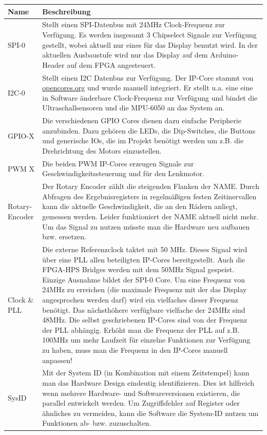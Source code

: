 \begin{longtable}[ht]{|p{} | p{} |}
	\hline
	\textbf{Name} & \textbf{Beschreibung}\\
	\hline
	SPI-0 & Stellt einen SPI-Datenbus mit 24MHz Clock-Frequenz zur Verfügung. Es werden insgesamt 3 Chipselect Signale zur Verfügung gestellt, wobei aktuell nur eines für das Display benutzt wird. In der aktuellen Ausbaustufe wird nur das Display auf dem Arduino-Header auf dem FPGA angesteuert.\\ \hline
	I2C-0 & Stellt einen I2C Datenbus zur Verfügung. Der \ac{IP}-Core stammt von \href{opencores.org}{opencores.org} und wurde manuell integriert. Er stellt u.a. eine eine in Software änderbare Clock-Frequenz zur Verfügung und bindet die Ultraschallsensoren und die MPU-6050 an das System an.\\ \hline
	GPIO-X & Die verschiedenen GPIO Cores dienen dazu einfache Peripherie anzubinden. Dazu gehören die LEDs, die Dip-Switches, die Buttons und generische IOs, die im Projekt benötigt werden um z.B. die Drehrichtung des Motors einzustellen. \\ \hline
	PWM X & Die beiden PWM \ac{IP}-Cores erzeugen Signale zur Geschwindigkeitssteuerung und für den Lenkmotor. \\ \hline
	Rotary-Encoder & Der Rotary Encoder zählt die steigenden Flanken der NAME. Durch Abfragen des Ergebnisregisters in regelmäßigen festen Zeitinervallen kann die aktuelle Geschwindigkeit, die an den Rädern anliegt, gemessen werden. Leider funktioniert der NAME aktuell nicht mehr. Um das Signal zu nutzen müsste man die Hardware neu aufbauen bzw. ersetzen.\\ \hline
	Clock \& \ac{PLL} & Die externe Referenzclock taktet mit 50 MHz. Dieses Signal wird über eine \ac{PLL} allen beteiligten IP-Cores bereitgestellt. Auch die \ac{FPGA}-\ac{HPS} Bridges werden mit dem 50MHz Signal gespeist. Einzige Ausnahme bildet der SPI-0 Core. Um eine Frequenz von 24MHz zu erreichen (die maximale Frequenz mit der das Display angesprochen werden darf) wird ein vielfaches dieser Frequenz benötigt. Das nächsthöhere verfügbare vielfache der 24MHz sind 48MHz. Die selbst geschriebenen \ac{IP}-Cores sind von der Frequenz der \ac{PLL} abhängig. Erhöht man die Frequenz der \ac{PLL} auf z.B. 100MHz um mehr Laufzeit für einzelne Funktionen zur Verfügung zu haben, muss man die Frequenz in den \ac{IP}-Cores manuell anpassen! \\ \hline
	SysID & Mit der System ID (in Kombination mit einem Zeitstempel) kann man das Hardware Design eindeutig identifizieren. Dies ist hilfreich wenn mehrere Hardware- und Softwareversionen existieren, die parallel entwickelt werden. Um Zugriffsfehler auf Register oder ähnliches zu vermeiden, kann die Software die System-ID nutzen um Funktionen ab- bzw. zuzuschalten. \\ \hline

\end{longtable}

